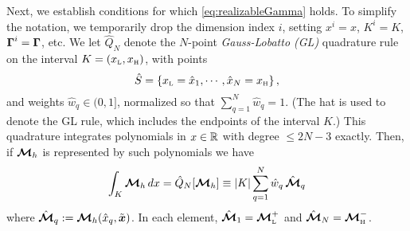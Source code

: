 Next, we establish conditions for which \eqref{eq:realizableGamma} holds.  
To simplify the notation, we temporarily drop the dimension index $i$, setting $x^{i}=x$, $K^{i}=K$, $\boldsymbol{\Gamma}^{i}=\boldsymbol{\Gamma}$, etc.  
We let $\hat{Q}_{N}$ denote the $N$-point \emph{Gauss-Lobatto (GL)} quadrature rule on the interval $K=(x_{\mbox{\tiny L}},x_{\mbox{\tiny H}})$, with points
\begin{equation}
  \hat{S}=\left\{x_{\mbox{\tiny L}}=\hat{x}_{1},\cdots,\hat{x}_{N}=x_{\mbox{\tiny H}}\right\}, 
  \label{eq:quadraturePointsGL}
\end{equation}
and weights $\hat{w}_{q} \in (0,1]$, normalized so that $\sum_{q=1}^{N} \hat{w}_{q} = 1$.  
(The hat is used to denote the GL rule, which includes the endpoints of the interval $K$.)
This quadrature integrates polynomials in $x \in \mathbb{R}$ with degree $\le2N-3$ exactly.  
Then, if $\boldsymbol{\mathcal{M}}_{h}$ is represented by such polynomials we have
\begin{equation}
  \int_{K} \boldsymbol{\mathcal{M}}_{h}\,dx = \hat{Q}_{N}[\boldsymbol{\mathcal{M}}_{h}] \equiv
  |K| \sum_{q=1}^{N} \hat{w}_{q}\,\hat{\boldsymbol{\mathcal{M}}}_{q}
  \label{eq:quadratureRuleGL}
\end{equation}
where $\hat{\boldsymbol{\mathcal{M}}}_{q} := \boldsymbol{\mathcal{M}}_{h}(\hat{x}_q,\tilde{\boldsymbol{x}})$.  
In each element, $\hat{\boldsymbol{\mathcal{M}}}_{1}=\boldsymbol{\mathcal{M}}_{\mbox{\tiny L}}^{+}$ and $\hat{\boldsymbol{\mathcal{M}}}_{N}=\boldsymbol{\mathcal{M}}_{\mbox{\tiny H}}^{-}$.  

